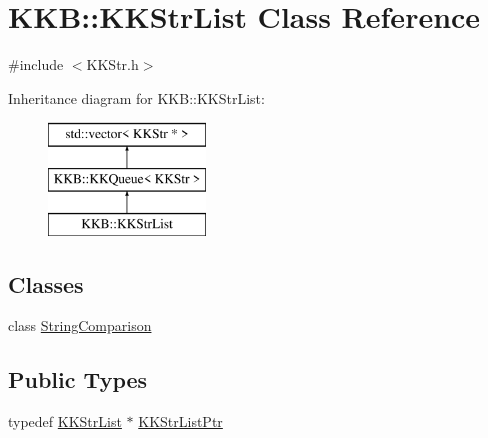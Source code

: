 \hypertarget{class_k_k_b_1_1_k_k_str_list}{}\section{K\+KB\+:\+:K\+K\+Str\+List Class Reference}
\label{class_k_k_b_1_1_k_k_str_list}


{\ttfamily \#include $<$K\+K\+Str.\+h$>$}

Inheritance diagram for K\+KB\+:\+:K\+K\+Str\+List\+:\begin{figure}[H]
\begin{center}
\leavevmode
\includegraphics[height=3.000000cm]{class_k_k_b_1_1_k_k_str_list}
\end{center}
\end{figure}
\subsection*{Classes}
\begin{DoxyCompactItemize}
\item 
class \hyperlink{class_k_k_str_list_1_1_string_comparison}{String\+Comparison}
\end{DoxyCompactItemize}
\subsection*{Public Types}
\begin{DoxyCompactItemize}
\item 
typedef \hyperlink{class_k_k_b_1_1_k_k_str_list}{K\+K\+Str\+List} $\ast$ \hyperlink{class_k_k_b_1_1_k_k_str_list_a466accb870aa75f4b47943932fccb4c8}{K\+K\+Str\+List\+Ptr}
\end{DoxyCompactItemize}

